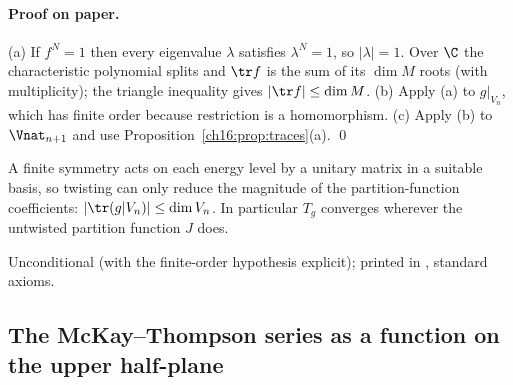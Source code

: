 \paragraph{Proof on paper.}  (a) If $f^N=1$ then every eigenvalue $\lambda$ satisfies $\lambda^N=1$, so $|\lambda|=1$.
Over $\C$ the characteristic polynomial splits and $\tr f$ is the sum of its $\dim M$ roots (with multiplicity); the
triangle inequality gives $|\tr f|\le\dim M$.  (b) Apply (a) to $g|_{V_n}$, which has finite order because
restriction is a homomorphism.  (c) Apply (b) to $\Vnat_{n+1}$ and use Proposition~\ref{ch16:prop:traces}(a). \qed
\begin{physics}
A finite symmetry acts on each energy level by a unitary matrix in a suitable basis, so twisting can only reduce the
magnitude of the partition-function coefficients: $|\tr(g|V_n)|\le\dim V_n$.  In particular $T_g$ converges wherever
the untwisted partition function $J$ does.
\end{physics}
\begin{status}
Unconditional (with the finite-order hypothesis explicit); printed in ,
standard axioms.
\end{status}

\subsection{The McKay--Thompson series as a function on the upper half-plane}

